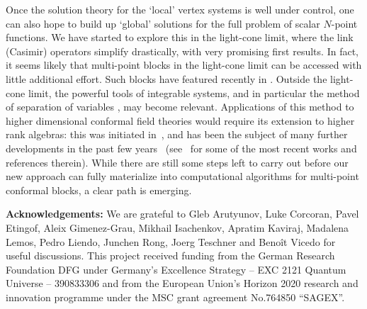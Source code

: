 \documentclass{article}
\begin{document}
Once the solution theory for the `local' vertex systems is 
well under control, one can also hope to build up `global' solutions 
for the full problem of scalar $N$-point functions. We have started 
to explore this in the light-cone limit, where the link (Casimir) operators  
simplify drastically, with very promising first results. In fact, 
it seems likely that multi-point blocks in the light-cone limit can 
be accessed with little additional effort. Such blocks have 
featured recently in \cite{Vieira:2020xfx}. Outside the light-cone limit, 
the powerful tools of integrable systems, and in particular the method of 
separation of variables \cite{Sklyanin:1987ih,Sklyanin:1995bm}, may 
become relevant. Applications of this method to higher dimensional 
conformal field theories would require its extension to higher rank
algebras: this was initiated in~\cite{Sklyanin:1992sm,Smirnov:2001},
and has been the subject of many further developments in the past few
years~\cite{Gromov:2016itr,Maillet:2018bim,Ryan:2018fyo}
(see~\cite{Ryan:2020rfk,Maillet:2020ykb,Derkachov:2020zvv,Gromov:2020fwh,
Cavaglia:2021mft} 
for some of the most recent works and references therein). While there are 
still some steps left to carry out before our new approach can fully 
materialize into computational algorithms for multi-point conformal 
blocks, a clear path is emerging. 
\bigskip 

\noindent 
\textbf{Acknowledgements:} We are grateful to Gleb Arutyunov, Luke Corcoran, 
Pavel Etingof, Aleix Gimenez-Grau, Mikhail Isachenkov, Apratim Kaviraj, 
Madalena Lemos, Pedro Liendo, Junchen Rong, Joerg Teschner and Benoît 
Vicedo for useful discussions. This project received funding from the 
German Research Foundation DFG under Germany’s Excellence Strategy -- EXC 
2121 Quantum Universe -- 390833306 and from the European Union’s Horizon 
2020 research and innovation programme under the MSC grant agreement 
No.764850 “SAGEX”.

\appendix
\end{document}
